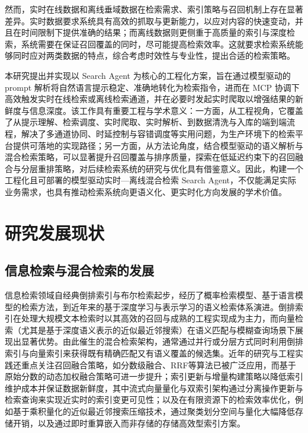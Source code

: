 然而，实时在线数据和离线垂域数据在检索需求、索引策略与召回机制上存在显著差异。实时数据要求系统具有高效的抓取与更新能力，以应对内容的快速变动，并且在时间限制下提供准确的结果；而离线数据则更侧重于高质量的索引与深度检索，系统需要在保证召回覆盖的同时，尽可能提高检索效率。这就要求检索系统能够同时应对两类数据的特点，综合考虑时效性与专业性，提出合适的检索策略。


本研究提出并实现以 Search Agent 为核心的工程化方案，旨在通过模型驱动的 prompt 解析将自然语言提示稳定、准确地转化为检索指令\cite{10.1145/3748304}，进而在 MCP 协调下高效触发实时在线检索或离线检索通道\cite{luo2025evaluationreportmcpservers}，并在必要时发起实时爬取以增强结果的新鲜度与信息深度。该工作具有重要工程与学术意义：一方面，从工程视角，它覆盖了从提示理解、检索调度、实时爬取、实时解析、到数据清洗与入库的端到端流程，解决了多通道协同、时延控制与容错调度等实用问题，为生产环境下的检索平台提供可落地的实现路径；另一方面，从方法论角度，结合模型驱动的语义解析与混合检索策略\cite{kalra2025morbetterhandlingdiverse}，可以显著提升召回覆盖与排序质量，探索在低延迟约束下的召回融合与分层重排策略，对后续检索系统的研究与优化具有借鉴意义。因此，构建一个工程化且可部署的模型驱动实时—离线混合检索 Search Agent，不仅能满足实际业务需求，也具有推动检索系统向更语义化、更实时化方向发展的学术价值。

\section{研究发展现状} \subsection{信息检索与混合检索的发展} 信息检索领域自经典倒排索引与布尔检索起步，经历了概率检索模型、基于语言模型的检索方法，到近年来的基于深度学习与表示学习的语义检索体系演进\cite{raj2025exploringnewapproachesinformation}。倒排索引在处理大规模文本检索时以其高效的召回与成熟的工程实现成为主力，而向量检索（尤其是基于深度语义表示的近似最近邻搜索）在语义匹配与模糊查询场景下展现出显著优势\cite{xu2026surveymodelarchitecturesinformation}。由此催生的混合检索架构，通常通过并行或分层方式同时利用倒排索引与向量索引来获得既有精确匹配又有语义覆盖的候选集。近年的研究与工程实践还重点关注召回融合策略，如分数级融合、RRF等算法已被广泛应用，而基于原始分数的动态加权融合策略可进一步提升；索引更新与增量构建策略以降低索引维护成本并保证数据新鲜度，其中流式向量量化与双索引架构通过分离操作更新与检索查询来实现近实时的索引变更可见性\cite{prajapati2025livevectorlakerealtimeversionedknowledge}；以及在有限资源下的检索效率优化，例如基于乘积量化的近似最近邻搜索压缩技术，通过聚类划分空间与量化大幅降低存储开销，以及通过即时重算嵌入而非存储的存储高效型索引方案\cite{wang2025leannlowstoragevectorindex}。

